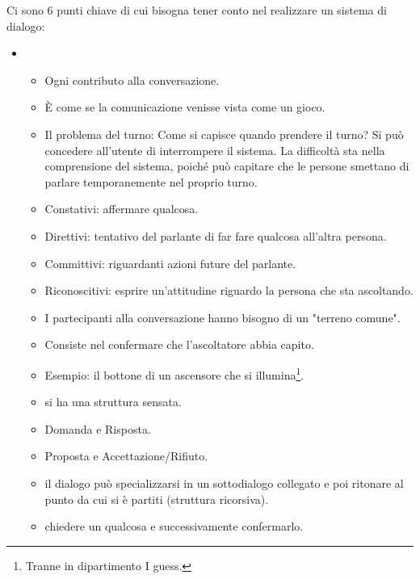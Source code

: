 Ci sono 6 punti chiave di cui bisogna tener conto nel realizzare un sistema di dialogo:

\begin{itemize}
  \item {} 
    \begin{itemize}
      \item Ogni contributo alla conversazione. 
      \item È come se la comunicazione venisse vista come un gioco.  
      \item Il problema del turno: Come si capisce quando prendere il turno? Si può concedere all'utente di interrompere il sistema. La difficoltà sta nella comprensione del sistema, poiché può capitare che le persone smettano di parlare temporanemente nel proprio turno.
    \end{itemize}
    \begin{itemize}
      \item Constativi: affermare qualcosa.
      \item Direttivi: tentativo del parlante di far fare qualcosa all'altra persona.
      \item Committivi: riguardanti azioni future del parlante.
      \item Riconoscitivi: esprire un'attitudine riguardo la persona che sta ascoltando.
    \end{itemize}
    \begin{itemize}
      \item I partecipanti alla conversazione hanno bisogno di un "terreno comune". 
      \item Consiste nel confermare che l'ascoltatore abbia capito. 
      \item Esempio: il bottone di un ascensore che si illumina\footnote{Tranne in dipartimento I guess.}.
    \end{itemize}
    \begin{itemize}
      \item {} si ha una struttura sensata. 
      \item Domanda e Risposta. 
      \item Proposta e Accettazione/Rifiuto.
    \item {} il dialogo può specializzarsi in un sottodialogo collegato e poi ritonare al punto da cui si è partiti (struttura ricorsiva). 
    \item {} chiedere un qualcosa e successivamente confermarlo.

\end{itemize}
\end{itemize}
